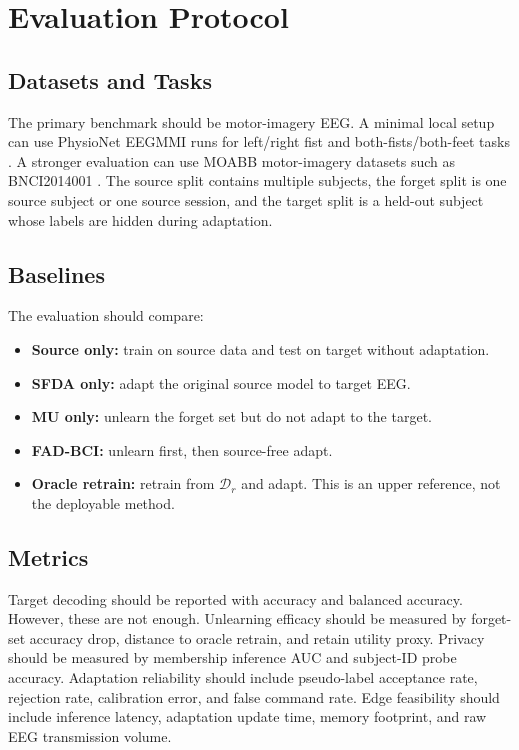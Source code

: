\documentclass[10pt,twocolumn]{article}
\begin{document}
\section{Evaluation Protocol}
\subsection{Datasets and Tasks}
The primary benchmark should be motor-imagery EEG. A minimal local setup can use PhysioNet EEGMMI runs for left/right fist and both-fists/both-feet tasks \cite{goldberger2000physionet}. A stronger evaluation can use MOABB motor-imagery datasets such as BNCI2014001 \cite{jayaram2018moabb}. The source split contains multiple subjects, the forget split is one source subject or one source session, and the target split is a held-out subject whose labels are hidden during adaptation.

\subsection{Baselines}
The evaluation should compare:
\begin{itemize}
\item \textbf{Source only:} train on source data and test on target without adaptation.
\item \textbf{SFDA only:} adapt the original source model to target EEG.
\item \textbf{MU only:} unlearn the forget set but do not adapt to the target.
\item \textbf{FAD-BCI:} unlearn first, then source-free adapt.
\item \textbf{Oracle retrain:} retrain from $\mathcal{D}_r$ and adapt. This is an upper reference, not the deployable method.
\end{itemize}

\subsection{Metrics}
Target decoding should be reported with accuracy and balanced accuracy. However, these are not enough. Unlearning efficacy should be measured by forget-set accuracy drop, distance to oracle retrain, and retain utility proxy. Privacy should be measured by membership inference AUC and subject-ID probe accuracy. Adaptation reliability should include pseudo-label acceptance rate, rejection rate, calibration error, and false command rate. Edge feasibility should include inference latency, adaptation update time, memory footprint, and raw EEG transmission volume.
\end{document}
